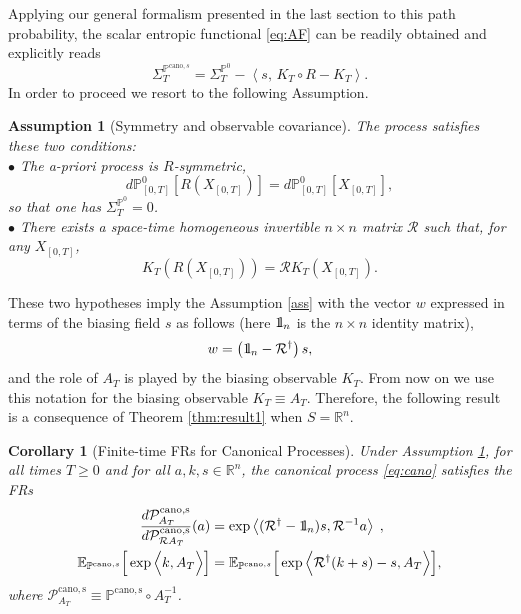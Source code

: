 \documentclass[a4paper,11pt]{article}
\numberwithin{equation}{section}
\newcommand{\bbbone}{\mathchoice {\rm 1\mskip-4mu l} {\rm 1\mskip-4mu l}
{\rm 1\mskip-4.5mu l} {\rm 1\mskip-5mu l}}
\newtheorem{corollary}[theorem]{Corollary}
\newtheorem{assumption}[theorem]{Assumption}
\begin{document}
Applying our general formalism presented in the last section to this
path probability, the scalar entropic functional \eqref{eq:AF} can be readily obtained and explicitly reads
$$
\varSigma_{T}^{\mathbb{P}^{\mathrm{cano},s}}=\varSigma_{T}^{\mathbb{P}^{0}}-\left\langle s, \, K_T \circ R - K_T \right\rangle .
$$
In order to proceed we resort to the following Assumption.
\begin{assumption}[Symmetry and observable covariance] \label{ass_cano}
The process satisfies these two conditions:\\
$\bullet$ The a-priori process is $R$-symmetric, 
\begin{equation}\label{eq:h1cano} d\mathbb{P}_{\left[0,T\right]}^{0}\left[R\left(X_{\left[0,T\right]}\right)\right]=d\mathbb{P}_{\left[0,T\right]}^{0}\left[X_{\left[0,T\right]}\right],
\end{equation}
so that one has $\varSigma_{T}^{\mathbb{P}^{0}}=0$. \\
$\bullet$  There exists a space-time homogeneous invertible $n \times n$ matrix $\mathcal{R}$ such that, for any $X_{\left[0,T\right]}$,
\begin{equation}\label{eq:hypothese-1-1}
K_T \left(R\left(X_{\left[0,T\right]}\right)\right)=\mathcal{R} K_T\left(X_{\left[0,T\right]}\right) .
\end{equation}
\end{assumption}


These two hypotheses imply the Assumption \ref{ass} with the vector $w$ expressed in terms of the biasing field $s$ as follows (here $\bbbone_n$ is the $n\times n$ identity matrix), 
\begin{equation}
 \label{eq:w-ici}   
w =\left(\bbbone_n-\mathcal{R}^{\dagger}\right) s, 
\end{equation}
and the role of $A_T$ is played by the biasing observable $K_T$. From now on we use this notation for the biasing observable $K_T \equiv A_T$. Therefore, the following result is a consequence of Theorem \ref{thm:result1} when $S=\mathbb{R}^n$.
\begin{corollary}[Finite-time FRs for Canonical Processes] 
Under Assumption \ref{ass_cano}, for all times $T \geq 0$ and for all $a,k,s \in \mathbb{R}^n$, the canonical process \eqref{eq:cano} satisfies the FRs 
    \begin{align}    
\frac{d \mathcal{P}_{A_T}^{\mathrm{cano,s}}}{d \mathcal{P}_{\mathcal{R}A_T}^{\mathrm{cano,s}} }(a) &=\exp \left\langle (\mathcal{R}^\dag - \bbbone_n) s,\mathcal{R}^{-1} a\right\rangle \; , \label{eq:canoVFR1} \\
\mathbb{E}_{\mathbb{P}^{\mathrm{cano},s}}\Big[\exp\Big\langle k,A_T\Big\rangle \Big] &=\mathbb{E}_{\mathbb{P}^{\mathrm{cano},s}}\Big[\exp \Big\langle \mathcal{R}^{\dagger} (k + s) - s, A_T\Big\rangle \Big] , \label{eq:canoVFR2}
    \end{align}
     where $\mathcal{P}_{A_T}^{\mathrm{cano,s}} \equiv \mathbb{P}^{\mathrm{cano,s}} \circ A_T^{-1}$.
\end{corollary}
\end{document}
